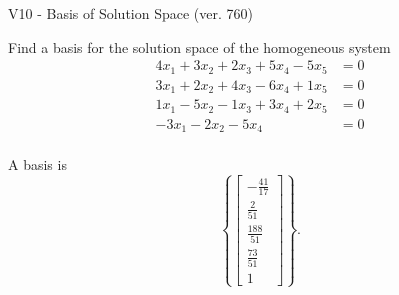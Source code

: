 \begin{exercise}
  \begin{exerciseTitle}V10 - Basis of Solution Space (ver. 760)\end{exerciseTitle}
  \begin{exerciseStatement}
    Find a basis for the solution space of the homogeneous system 
\begin{align*}
 4 x_ 1 + 3 x_ 2 + 2 x_ 3 + 5 x_ 4 -5 x_ 5 &= 0  \\ 
  3 x_ 1 + 2 x_ 2 + 4 x_ 3 -6 x_ 4 + 1 x_ 5 &= 0  \\ 
  1 x_ 1 -5 x_ 2 -1 x_ 3 + 3 x_ 4 + 2 x_ 5 &= 0  \\ 
  -3 x_ 1 -2 x_ 2 -5 x_ 4 &= 0  \\ 
 \end{align*}


 
  \end{exerciseStatement}

  \begin{exerciseAnswer}
   A basis is   
\[\left\{\left[\begin{array}{c}
-\frac{41}{17} \\
\frac{2}{51} \\
\frac{188}{51} \\
\frac{73}{51} \\
1
\end{array}\right]\right\}.\]

  


  \end{exerciseAnswer}
\end{exercise}